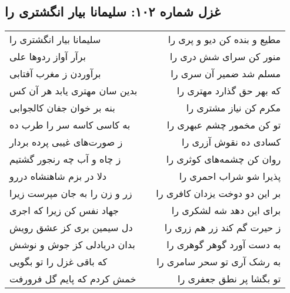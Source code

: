 \begin{center}
\section*{غزل شماره ۱۰۲: سلیمانا بیار انگشتری را}
\label{sec:0102}
\begin{longtable}{l p{0.5cm} r}
سلیمانا بیار انگشتری را
&&
مطیع و بنده کن دیو و پری را
\\
برآر آواز ردوها علی
&&
منور کن سرای شش دری را
\\
برآوردن ز مغرب آفتابی
&&
مسلم شد ضمیر آن سری را
\\
بدین سان مهتری یابد هر آن کس
&&
که بهر حق گذارد مهتری را
\\
بنه بر خوان جفان کالجوابی
&&
مکرم کن نیاز مشتری را
\\
به کاسی کاسه سر را طرب ده
&&
تو کن مخمور چشم عبهری را
\\
ز صورت‌های غیبی پرده بردار
&&
کسادی ده نقوش آزری را
\\
ز چاه و آب چه رنجور گشتیم
&&
روان کن چشمه‌های کوثری را
\\
دلا در بزم شاهنشاه دررو
&&
پذیرا شو شراب احمری را
\\
زر و زن را به جان مپرست زیرا
&&
بر این دو دوخت یزدان کافری را
\\
جهاد نفس کن زیرا که اجری
&&
برای این دهد شه لشکری را
\\
دل سیمین بری کز عشق رویش
&&
ز حیرت گم کند زر هم زری را
\\
بدان دریادلی کز جوش و نوشش
&&
به دست آورد گوهر گوهری را
\\
که باقی غزل را تو بگویی
&&
به رشک آری تو سحر سامری را
\\
خمش کردم که پایم گل فرورفت
&&
تو بگشا پر نطق جعفری را
\\
\end{longtable}
\end{center}
